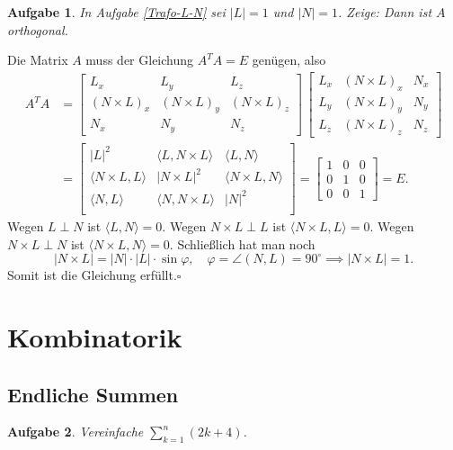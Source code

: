 \documentclass[a4paper,10pt,fleqn,twoside]{scrartcl}
\numberwithin{equation}{section}
\newcommand{\strong}[1]{{\normalfont\sffamily\bfseries #1}}
\renewcommand{\qedsymbol}{\ensuremath{\square}}
\theoremstyle{Aufgabe}
\newtheorem{Aufgabe}{\sffamily Aufgabe}[section]
\begin{document}
\begin{Aufgabe}
In Aufgabe \ref{Trafo-L-N} sei $|L|=1$ und $|N|=1$.
Zeige: Dann ist $A$ orthogonal.
\end{Aufgabe}

\noindent\strong{Lösung.} Die Matrix $A$ muss der
Gleichung $A^T A = E$ genügen, also
\begin{align}
A^T A &= \begin{bmatrix}
L_x & L_y & L_z\\
(N\times L)_x & (N\times L)_y & (N\times L)_z\\
N_x & N_y & N_z
\end{bmatrix}\,
\begin{bmatrix}
L_x & (N\times L)_x & N_x\\
L_y & (N\times L)_y & N_y\\
L_z & (N\times L)_z & N_z
\end{bmatrix}\\
&= \begin{bmatrix}
|L|^2 & \langle L,N\times L\rangle & \langle L,N\rangle\\
\langle N\times L,L\rangle & |N\times L|^2 & \langle N\times L,N\rangle\\
\langle N,L\rangle & \langle N,N\times L\rangle & |N|^2\\
\end{bmatrix}
= \begin{bmatrix}
1 & 0 & 0\\
0 & 1 & 0\\
0 & 0 & 1
\end{bmatrix} = E.
\end{align}
Wegen $L\perp N$ ist $\langle L,N\rangle=0$. Wegen $N\times L\perp L$
ist $\langle N\times L,L\rangle=0$. Wegen $N\times L\perp N$ ist
$\langle N\times L,N\rangle=0$. Schließlich hat man noch
\begin{equation}
|N\times L| = |N|\cdot|L|\cdot\sin \varphi,\quad \varphi=\angle(N,L)=90^\circ\implies |N\times L|=1.
\end{equation}
Somit ist die Gleichung erfüllt.\;\qedsymbol

\newpage
\section{Kombinatorik}
\subsection{Endliche Summen}
\begin{Aufgabe}
Vereinfache $\displaystyle\sum_{k=1}^n (2k+4)$.
\end{Aufgabe}
\end{document}
